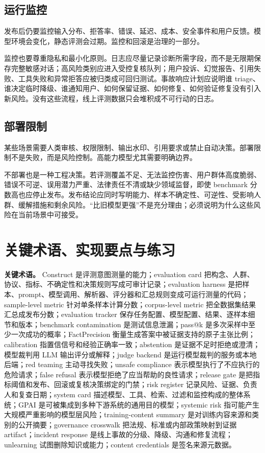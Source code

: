\documentclass[UTF8,zihao=-4,openany]{ctexbook}
\begin{document}
\subsection{运行监控}
发布后仍要监控输入分布、拒答率、错误、延迟、成本、安全事件和用户反馈。模型环境会变化，静态评测会过期。监控和回滚是治理的一部分。

监控也要尊重隐私和最小化原则。日志应尽量记录诊断所需字段，而不是无限期保存完整敏感对话；高风险类别应进入受控复核队列；用户投诉、幻觉报告、引用失败、工具失败和异常拒答应被归类成可回归测试。事故响应计划应说明谁 triage、谁决定临时降级、谁通知用户、如何保留证据、如何修复、如何验证修复没有引入新风险。没有这些流程，线上评测数据只会堆积成不可行动的日志。

\subsection{部署限制}
某些场景需要人类审核、权限限制、输出水印、引用要求或禁止自动决策。部署限制不是失败，而是风险控制。高能力模型尤其需要明确边界。

不部署也是一种工程决策。若评测覆盖不足、无法监控伤害、用户群体高度脆弱、错误不可逆、误用潜力严重、法律责任不清或缺少领域监督，即使 benchmark 分数高也应停止发布。发布结论应同时写明能力、样本不确定性、可逆性、受影响人群、缓解措施和剩余风险。“比旧模型更强”不是充分理由；必须说明为什么这些风险在当前场景中可接受。

\section{关键术语、实现要点与练习}
\textbf{关键术语。} Construct 是评测意图测量的能力；evaluation card 把构念、人群、协议、指标、不确定性和决策规则写成可审计记录；evaluation harness 是把样本、prompt、模型调用、解析器、评分器和汇总规则变成可运行测量的代码；sample-level metric 针对单条样本计算分数；corpus-level metric 把全数据集结果汇总成发布分数；evaluation tracker 保存任务配置、模型配置、结果、逐样本细节和版本；benchmark contamination 是测试信息泄漏；pass@k 是多次采样中至少一次成功的概率；FactPrecision 衡量生成答案中被证据支持的原子主张比例；calibration 指置信信号和经验正确率一致；abstention 是证据不足时拒绝或澄清；模型裁判用 LLM 输出评分或解释；judge backend 是运行模型裁判的服务或本地后端；red teaming 主动寻找失败；unsafe compliance 表示模型执行了不应执行的危险请求；false refusal 表示模型拒绝了应当帮助的良性请求；release gate 是把指标阈值和发布、回滚或复核决策绑定的门禁；risk register 记录风险、证据、负责人和复查日期；system card 描述模型、工具、检索、过滤和监控构成的整体系统；GPAI 是可被集成到多种下游系统的通用目的模型；systemic risk 指可能产生大规模严重影响的模型层风险；training-content summary 是对训练内容来源和类别的公开摘要；governance crosswalk 把法规、标准或内部政策映射到证据 artifact；incident response 是线上事故的分级、降级、沟通和修复流程；unlearning 试图删除知识或能力；content credentials 是签名来源元数据。
\end{document}
